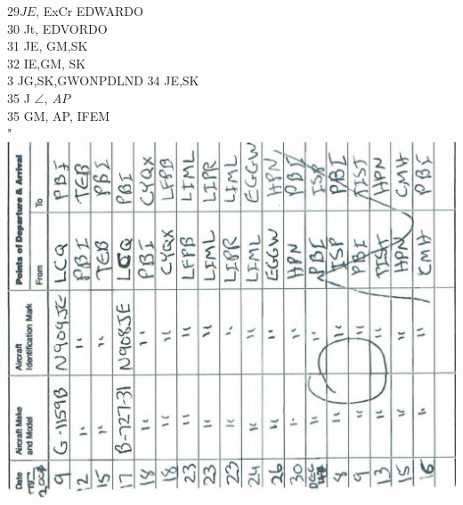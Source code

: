 \documentclass[10pt]{article}
\begin{document}
\(29 J E\), ExCr EDWARDO\\
30 Jt, EDVORDO\\
31 JE, GM,SK\\
32 IE,GM, SK\\
3 JG,SK,GWONPDLND 34 JE,SK\\
35 J \(\angle, ~ A P\)\\
35 GM, AP, IFEM\\
"\\
\includegraphics[max width=\textwidth, center]{2025_02_27_dd68c3d38de88f0516d9g-092(3)}
\end{document}
